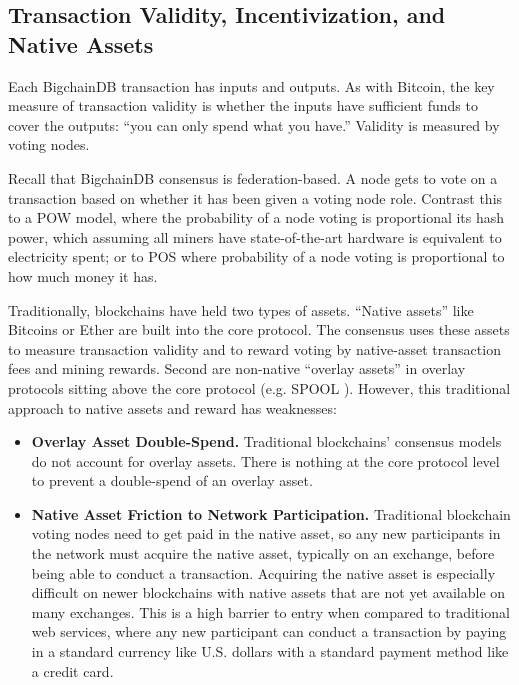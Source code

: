 \subsection{Transaction Validity, Incentivization, and Native Assets}
Each BigchainDB transaction has inputs and outputs.
As with Bitcoin, the key measure of transaction validity is whether the inputs have sufficient funds to cover the outputs: “you can only spend what you have.”
Validity is measured by voting nodes.

Recall that BigchainDB consensus is federation-based.
A node gets to vote on a transaction based on whether it has been given a voting node role.
Contrast this to a POW model, where the probability of a node voting is proportional its hash power, which assuming all miners have state-of-the-art hardware is equivalent to electricity spent; or to POS where probability of a node voting is proportional to how much money it has.

Traditionally, blockchains have held two types of assets. 
“Native assets” like Bitcoins or Ether are built into the core protocol. 
The consensus uses these assets to measure transaction validity and to reward voting by native-asset transaction fees and mining rewards. 
Second are non-native “overlay assets” in overlay protocols sitting above the core protocol (e.g. SPOOL \cite{dejonghe_spool}).
However, this traditional approach to native assets and reward has weaknesses:

\begin{itemize}
 \item \textbf{Overlay Asset Double-Spend.} Traditional blockchains’ consensus models do not account for overlay assets. There is nothing at the core protocol level to prevent a double-spend of an overlay asset.
 \item \textbf{Native Asset Friction to Network Participation.} Traditional blockchain voting nodes need to get paid in the native asset, so any new participants in the network must acquire the native asset, typically on an exchange, before being able to conduct a transaction. Acquiring the native asset is especially difficult on newer blockchains with native assets that are not yet available on many exchanges. This is a high barrier to entry when compared to traditional web services, where any new participant can conduct a transaction by paying in a standard currency like U.S. dollars with a standard payment method like a credit card.
\end{itemize}

